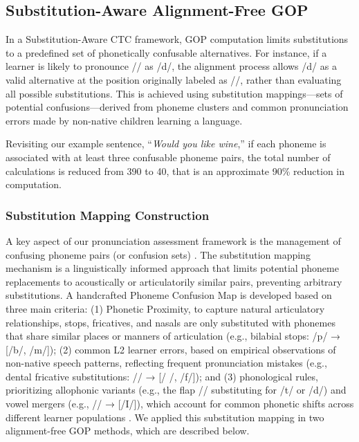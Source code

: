 \documentclass{Interspeech}
\begin{document}
\subsection{Substitution-Aware Alignment-Free GOP}

In a Substitution-Aware CTC framework, GOP computation limits substitutions to a predefined set of phonetically confusable alternatives. For instance, if a learner is likely to pronounce /\textipa{\dh}/ as /d/, the alignment process allows /d/ as a valid alternative at the position originally labeled as /\textipa{\dh}/, rather than evaluating all possible substitutions. This is achieved using substitution mappings—sets of potential confusions—derived from phoneme clusters and common pronunciation errors made by non-native children learning a language.

Revisiting our example sentence, “\textit{Would you like wine},” if each phoneme is associated with at least three confusable phoneme pairs, the total number of calculations is reduced from 390 to 40, that is an approximate 90\% reduction in computation.


\subsubsection{Substitution Mapping Construction}
\label{sec:map}


A key aspect of our pronunciation assessment framework is the management of confusing phoneme pairs (or confusion sets) \cite{meng2009multilingual,oh2021hierarchical}.
%
The substitution mapping mechanism is a linguistically informed approach that limits potential phoneme replacements to acoustically or articulatorily similar pairs, preventing arbitrary substitutions. A handcrafted Phoneme Confusion Map is developed based on three main criteria:
(1) Phonetic Proximity, to capture natural articulatory relationships, stops, fricatives, and nasals are only substituted with phonemes that share similar places or manners of articulation (e.g., bilabial stops: /p/ → [/b/, /m/]); 
(2) common L2 learner errors, based on empirical observations of non-native speech patterns, reflecting frequent pronunciation mistakes (e.g., dental fricative substitutions: /\texttheta/ → [/ \textipa{\dh}/, /f/]);
and (3) phonological rules, prioritizing allophonic variants (e.g., the flap /\textfishhookr/ substituting for /t/ or /d/) and vowel mergers (e.g., // → [/I/]), which account for common phonetic shifts across different learner populations \cite{cucchiarini2011error,cucchiarini2012my,kruitbosch2020pronunciation,wheelock2016phonological}. We applied this substitution mapping in two alignment-free GOP methods, which are described below.
\end{document}
